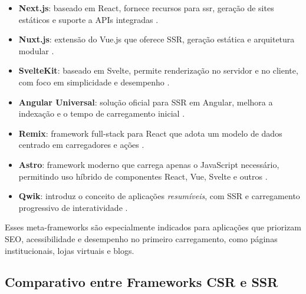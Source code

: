 \begin{itemize}
    \item \textbf{Next.js}: baseado em React, fornece recursos para \acrshort{ssr}, geração de sites estáticos e suporte a APIs integradas \cite{nextjs2024}.
    
    \item \textbf{Nuxt.js}: extensão do Vue.js que oferece SSR, geração estática e arquitetura modular \cite{nuxtjs2024}.
    
    \item \textbf{SvelteKit}: baseado em Svelte, permite renderização no servidor e no cliente, com foco em simplicidade e desempenho \cite{sveltekit2024}.
    
    \item \textbf{Angular Universal}: solução oficial para SSR em Angular, melhora a indexação e o tempo de carregamento inicial \cite{angularuniversal2024}.
    
    \item \textbf{Remix}: framework full-stack para React que adota um modelo de dados centrado em carregadores e ações \cite{remix2024}.
    
    \item \textbf{Astro}: framework moderno que carrega apenas o JavaScript necessário, permitindo uso híbrido de componentes React, Vue, Svelte e outros \cite{astro2024}.
    
    \item \textbf{Qwik}: introduz o conceito de aplicações \textit{resumíveis}, com SSR e carregamento progressivo de interatividade \cite{qwik2024}.
\end{itemize}

Esses meta-frameworks são especialmente indicados para aplicações que priorizam SEO, acessibilidade e desempenho no primeiro carregamento, como páginas institucionais, lojas virtuais e blogs.

\subsection{Comparativo entre Frameworks CSR e SSR}
\label{subsec:comparativo-frameworks}

